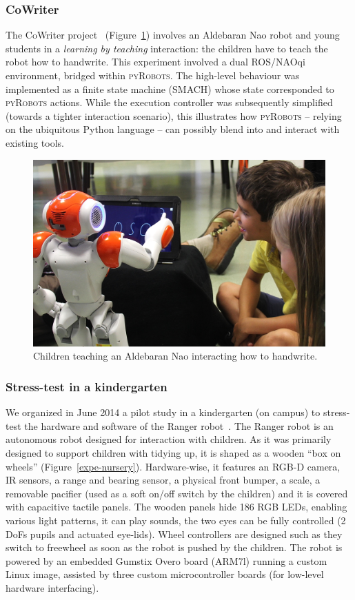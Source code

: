 \documentclass[a4paper, 10pt, conference]{ieeeconf}      %
\newcommand{\pyRobots}{\textsc{pyRobots}}
\begin{document}
\subsubsection{CoWriter} The {\sc CoWriter} project~\cite{hood2015those}
(Figure~\ref{expe-cowriter}) involves an Aldebaran Nao robot and young students
in a \emph{learning by teaching} interaction: the children have to teach the
robot how to handwrite. This experiment involved a dual ROS/NAOqi environment,
bridged within \pyRobots{}. The high-level behaviour was implemented as a finite
state machine ({\sc SMACH}) whose state corresponded to \pyRobots{} actions.
While the execution controller was subsequently simplified (towards a tighter
interaction scenario), this illustrates how \pyRobots{} -- relying on the
ubiquitous Python language -- can possibly blend into and interact with existing
tools.

\begin{figure}
        \centering
        \includegraphics[width=0.9\columnwidth]{cowriter}
        \caption{Children teaching an Aldebaran Nao interacting how to
        handwrite.}
        \label{expe-cowriter}
\end{figure}

\subsubsection{Stress-test in a kindergarten}
\label{croq}

We organized in June 2014 a pilot study in a kindergarten (on campus) to
stress-test the hardware and software of the Ranger
robot~\cite{mondada2014ranger}. The Ranger robot is an autonomous robot designed
for interaction with children. As it was primarily designed to support children
with tidying up, it is shaped as a wooden ``box on wheels''
(Figure~\ref{expe-nursery}). Hardware-wise, it features an RGB-D camera, IR
sensors, a range and bearing sensor, a physical front bumper, a scale, a
removable pacifier (used as a soft on/off switch by the children) and it is
covered with capacitive tactile panels. The wooden panels hide 186 RGB LEDs,
enabling various light patterns, it can play sounds, the two eyes can be fully
controlled (2 DoFs pupils and actuated eye-lids). Wheel controllers are designed
such as they switch to freewheel as soon as the robot is pushed by the children.
The robot is powered by an embedded Gumstix Overo board (ARM7l) running a custom
Linux image, assisted by three custom microcontroller boards (for low-level
hardware interfacing).
\end{document}

